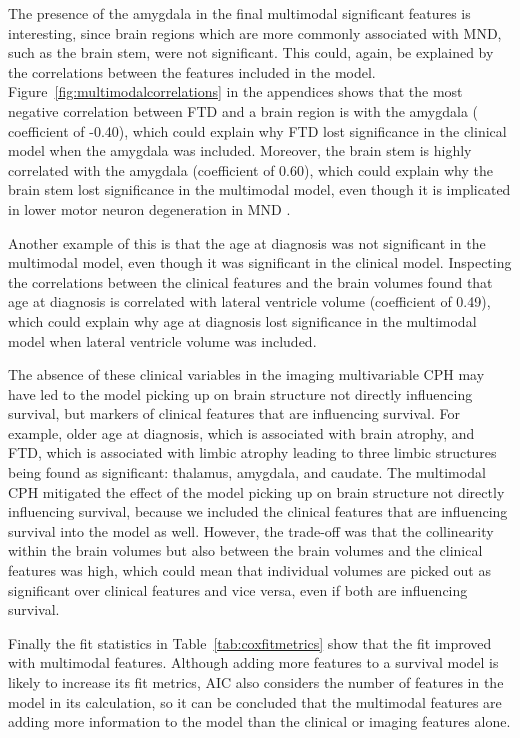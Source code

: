 The presence of the amygdala in the final multimodal significant features is interesting, since brain regions which are more commonly associated with MND, such as the brain stem, were not significant.
This could, again, be explained by the correlations between the features included in the model.
Figure~\ref{fig:multimodalcorrelations} in the appendices shows that the most negative correlation between FTD and a brain region is with the amygdala (
coefficient of -0.40), which could explain why FTD lost significance in the clinical model when the amygdala was included.
Moreover, the brain stem is highly correlated with the amygdala (coefficient of 0.60), which could explain why the brain stem lost significance in the multimodal model, even though it is implicated in lower motor neuron degeneration in MND .

Another example of this is that the age at diagnosis was not significant in the multimodal model, even though it was significant in the clinical model.
Inspecting the correlations between the clinical features and the brain volumes found that age at diagnosis is correlated with lateral ventricle volume (coefficient of 0.49), which could explain why age at diagnosis lost significance in the multimodal model when lateral ventricle volume was included.

The absence of these clinical variables in the imaging multivariable CPH may have led to the model picking up on brain structure not directly influencing survival, but markers of clinical features that are influencing survival.
For example, older age at diagnosis, which is associated with brain atrophy, and FTD, which is associated with limbic atrophy leading to three limbic structures being found as significant: thalamus, amygdala, and caudate.
The multimodal CPH mitigated the effect of the model picking up on brain structure not directly influencing survival, because we included the clinical features that are influencing survival into the model as well.
However, the trade-off was that the collinearity within the brain volumes but also between the brain volumes and the clinical features was high, which could mean that individual volumes are picked out as significant over clinical features and vice versa, even if both are influencing survival.

Finally the fit statistics in Table~\ref{tab:coxfitmetrics} show that the fit improved with multimodal features.
Although adding more features to a survival model is likely to increase its fit metrics, AIC also considers the number of features in the model in its calculation, so it can be concluded that the multimodal features are adding more information to the model than the clinical or imaging features alone.

